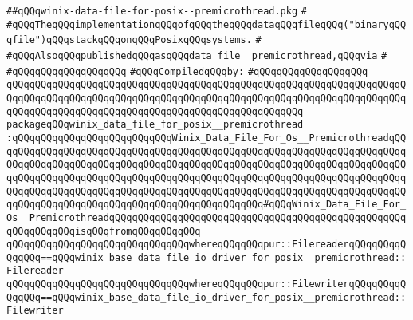 \label{src/lib/std/src/posix/winix-data-file-for-posix--premicrothread.pkg}
\verb|##qQQqwinix-data-file-for-posix--premicrothread.pkg|\newline
\verb|#|\newline
\verb|#qQQqTheqQQqimplementationqQQqofqQQqtheqQQqdataqQQqfileqQQq("binaryqQQqfile")qQQqstackqQQqonqQQqPosixqQQqsystems.|\newline
\verb|#|\newline
\verb|#qQQqAlsoqQQqpublishedqQQqasqQQqdata_file__premicrothread,qQQqvia|\newline
\verb|#|\newline
\verb|#qQQqqQQqqQQqqQQqqQQq|\newline
\newline
\verb|#qQQqCompiledqQQqby:|\newline
\verb|#qQQqqQQqqQQqqQQqqQQq|\newline
\newline
\newline
\newline
\verb|qQQqqQQqqQQqqQQqqQQqqQQqqQQqqQQqqQQqqQQqqQQqqQQqqQQqqQQqqQQqqQQqqQQqqQQqqQQqqQQqqQQqqQQqqQQqqQQqqQQqqQQqqQQqqQQqqQQqqQQqqQQqqQQqqQQqqQQqqQQqqQQqqQQqqQQqqQQqqQQqqQQqqQQqqQQqqQQqqQQqqQQqqQQqqQQq|\newline
\verb|packageqQQqwinix_data_file_for_posix__premicrothread|\newline
\verb|:qQQqqQQqqQQqqQQqqQQqqQQqqQQqWinix_Data_File_For_Os__PremicrothreadqQQqqQQqqQQqqQQqqQQqqQQqqQQqqQQqqQQqqQQqqQQqqQQqqQQqqQQqqQQqqQQqqQQqqQQqqQQqqQQqqQQqqQQqqQQqqQQqqQQqqQQqqQQqqQQqqQQqqQQqqQQqqQQqqQQqqQQqqQQqqQQqqQQqqQQqqQQqqQQqqQQqqQQqqQQqqQQqqQQqqQQqqQQqqQQqqQQqqQQqqQQqqQQqqQQqqQQqqQQqqQQqqQQqqQQqqQQqqQQqqQQqqQQqqQQqqQQqqQQqqQQqqQQqqQQqqQQqqQQqqQQqqQQqqQQqqQQqqQQqqQQqqQQqqQQqqQQqqQQqqQQqqQQq#qQQqWinix_Data_File_For_Os__PremicrothreadqQQqqQQqqQQqqQQqqQQqqQQqqQQqqQQqqQQqqQQqqQQqqQQqqQQqqQQqqQQqqQQqisqQQqfromqQQqqQQqqQQq|\newline
\verb|qQQqqQQqqQQqqQQqqQQqqQQqqQQqqQQqwhereqQQqqQQqpur::FilereaderqQQqqQQqqQQqqQQq==qQQqwinix_base_data_file_io_driver_for_posix__premicrothread::Filereader|\newline
\verb|qQQqqQQqqQQqqQQqqQQqqQQqqQQqqQQqwhereqQQqqQQqpur::FilewriterqQQqqQQqqQQqqQQq==qQQqwinix_base_data_file_io_driver_for_posix__premicrothread::Filewriter|\newline
